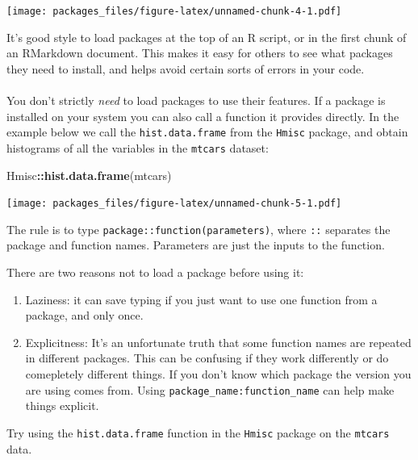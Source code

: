 \documentclass[]{article}
\newenvironment{Shaded}{\begin{snugshade}}{\end{snugshade}}
\newcommand{\KeywordTok}[1]{\textcolor[rgb]{0.13,0.29,0.53}{\textbf{#1}}}
\newcommand{\NormalTok}[1]{#1}
\newcommand{\OperatorTok}[1]{\textcolor[rgb]{0.81,0.36,0.00}{\textbf{#1}}}
\let\oldparagraph\paragraph
\renewcommand{\paragraph}[1]{\oldparagraph{#1}\mbox{}}
\begin{document}
\texttt{[image: packages\_files/figure-latex/unnamed-chunk-4-1.pdf]}

It's good style to load packages at the top of an R script, or in the first
chunk of an RMarkdown document. This makes it easy for others to see what
packages they need to install, and helps avoid certain sorts of errors in your
code.

\hypertarget{package-namespacing}{%
\paragraph{}\label{package-namespacing}}

You don't strictly \emph{need} to load packages to use their features. If a package
is installed on your system you can also call a function it provides directly.
In the example below we call the \texttt{hist.data.frame} from the \texttt{Hmisc} package, and
obtain histograms of all the variables in the \texttt{mtcars} dataset:

\begin{Shaded}
\begin{Highlighting}[]
\NormalTok{Hmisc}\OperatorTok{::}\KeywordTok{hist.data.frame}\NormalTok{(mtcars)}
\end{Highlighting}
\end{Shaded}

\texttt{[image: packages\_files/figure-latex/unnamed-chunk-5-1.pdf]}

The rule is to type \texttt{package::function(parameters)}, where \texttt{::} separates the
package and function names. Parameters are just the inputs to the function.

There are two reasons not to load a package before using it:

\begin{enumerate}
\def\labelenumi{\arabic{enumi}.}
\item
  Laziness: it can save typing if you just want to use one function from a
  package, and only once.
\item
  Explicitness: It's an unfortunate truth that some function names are repeated
  in different packages. This can be confusing if they work differently or do
  comepletely different things. If you don't know which package the version you
  are using comes from. Using \texttt{package\_name:function\_name} can help make things
  explicit.
\end{enumerate}

Try using the \texttt{hist.data.frame} function in the \texttt{Hmisc} package on the \texttt{mtcars}
data.
\end{document}

